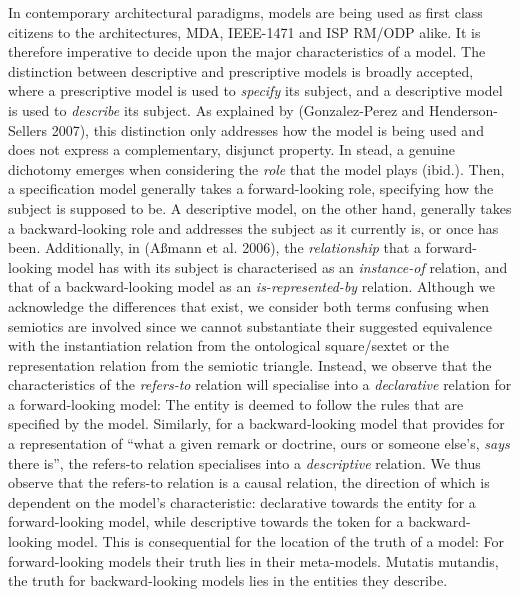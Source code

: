 \documentclass[a4paper,11pt,oneside,oldfontcommands]{memoir}
\newcounter{para}
\theoremstyle{definition}
\theoremstyle{break}		%
\numberwithin{equation}{chapter}
\numberwithin{figure}{chapter}
\begin{document}
In contemporary architectural paradigms, models are being used as first
class citizens to the architectures, MDA, IEEE-1471 and ISP RM/ODP
alike. It is therefore imperative to decide upon the major
characteristics of a model. The distinction between descriptive and
prescriptive models is broadly accepted, where a prescriptive model is
used to \emph{specify} its subject, and a descriptive model is used to
\emph{describe} its subject. As explained by (Gonzalez-Perez and
Henderson-Sellers 2007), this distinction only addresses how the model
is being used and does not express a complementary, disjunct property.
In stead, a genuine dichotomy emerges when considering the \emph{role}
that the model plays (ibid.). Then, a specification model generally
takes a forward-looking role, specifying how the subject is supposed to
be. A descriptive model, on the other hand, generally takes a
backward-looking role and addresses the subject as it currently is, or
once has been. Additionally, in (Aßmann et al. 2006), the
\emph{relationship} that a forward-looking model has with its subject is
characterised as an \emph{instance-of} relation, and that of a
backward-looking model as an \emph{is-represented-by} relation. Although
we acknowledge the differences that exist, we consider both terms
confusing when semiotics are involved since we cannot substantiate their
suggested equivalence with the instantiation relation from the
ontological square/sextet or the representation relation from the
semiotic triangle. Instead, we observe that the characteristics of the
\emph{refers-to} relation will specialise into a \emph{declarative}
relation for a forward-looking model: The entity is deemed to follow the
rules that are specified by the model. Similarly, for a backward-looking
model that provides for a representation of ``what a given remark or
doctrine, ours or someone else's, \emph{says} there is'', the refers-to
relation specialises into a \emph{descriptive} relation. We thus observe
that the refers-to relation is a causal relation, the direction of which
is dependent on the model's characteristic: declarative towards the
entity for a forward-looking model, while descriptive towards the token
for a backward-looking model. This is consequential for the location of
the truth of a model: For forward-looking models their truth lies in
their meta-models. Mutatis mutandis, the truth for backward-looking
models lies in the entities they describe.
\end{document}
